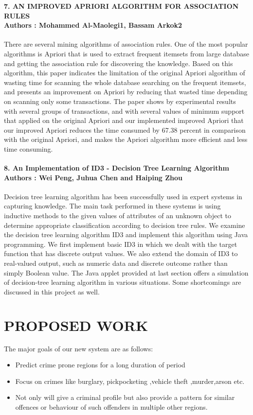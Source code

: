 \documentclass[12pt]{extreport}
\begin{document}
\newpage
\noindent
\textbf{7. AN IMPROVED APRIORI ALGORITHM FOR ASSOCIATION RULES}\\
\textbf{Authors : Mohammed Al-Maolegi1, Bassam Arkok2}\\\\
There are several mining algorithms of association rules. One of the most popular algorithms is Apriori that is used to extract frequent itemsets from large database and getting the association rule for discovering the knowledge. Based on this algorithm, this paper indicates the limitation of the original Apriori algorithm of wasting time for scanning the whole database searching on the frequent itemsets, and presents an improvement on Apriori by reducing that wasted time depending on scanning only some transactions. The paper shows by experimental results with several groups of transactions, and with several values of minimum support that applied on the original Apriori and our implemented improved Apriori that our improved Apriori reduces the time consumed by 67.38 percent in comparison with the original Apriori, and makes the Apriori algorithm more efficient and less time consuming.\\\\
\textbf{8. An Implementation of ID3 - Decision Tree Learning Algorithm}\\
\textbf{Authors : Wei Peng, Juhua Chen and Haiping Zhou }\\\\
Decision tree learning algorithm has been successfully used in expert
systems in capturing knowledge. The main task performed in these systems is using inductive methods to the given values of attributes of an unknown object to determine appropriate classification according to decision tree rules. We examine the decision tree learning algorithm ID3 and implement this algorithm using Java programming. We first implement basic ID3 in which we dealt with the target function that has discrete output values. We also extend the domain of ID3 to real-valued output, such as numeric data and discrete outcome rather than simply Boolean value. The Java applet provided at last section offers a simulation of decision-tree learning algorithm in various situations. Some shortcomings are discussed in this project as well.


\section{PROPOSED WORK}
The major goals of our new system are as follows:
\begin{itemize}
\item Predict crime prone regions for a long duration of period
\item Focus on crimes like burglary, pickpocketing ,vehicle theft
,murder,arson etc.
\item Not only will give a criminal profile but also provide a pattern for
similar offences or behaviour of such offenders in multiple other
regions.
\end{itemize}
\end{document}
